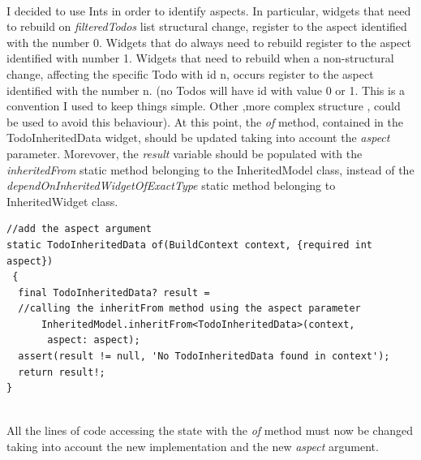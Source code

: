 \mbox{}\\
I decided to use Ints in order to identify aspects. In particular, widgets that need to rebuild on \textit{filteredTodos} list structural change, register to the aspect identified with the number 0. Widgets that do always need to rebuild register to the aspect identified with number 1. Widgets that need to rebuild when a non-structural change, affecting the specific Todo with id n, occurs register to the aspect identified with the number n. (no Todos will have id with value 0 or 1. This is a convention I used to keep things simple. Other ,more complex structure , could be used to avoid this behaviour). 
At this point, the \textit{of} method, contained in the TodoInheritedData widget, should be updated taking into account the \textit{aspect} parameter. Morevover, the \textit{result} variable should be populated with the \textit{inheritedFrom} static method belonging to the InheritedModel class, instead of the \textit{dependOnInheritedWidgetOfExactType} static method belonging to InheritedWidget class.
\mbox{}\\
\begin{code}
\mbox{}
\label{code:2.45}
\begin{verbatim}
//add the aspect argument
static TodoInheritedData of(BuildContext context, {required int aspect})
 {
  final TodoInheritedData? result =
  //calling the inheritFrom method using the aspect parameter
      InheritedModel.inheritFrom<TodoInheritedData>(context,
       aspect: aspect);
  assert(result != null, 'No TodoInheritedData found in context');
  return result!;
}
\end{verbatim}
\end{code}
\mbox{}\\
All the lines of code accessing the state with the \textit{of} method must now be changed taking into account the new implementation and the new \textit{aspect} argument.
\mbox{}\\

